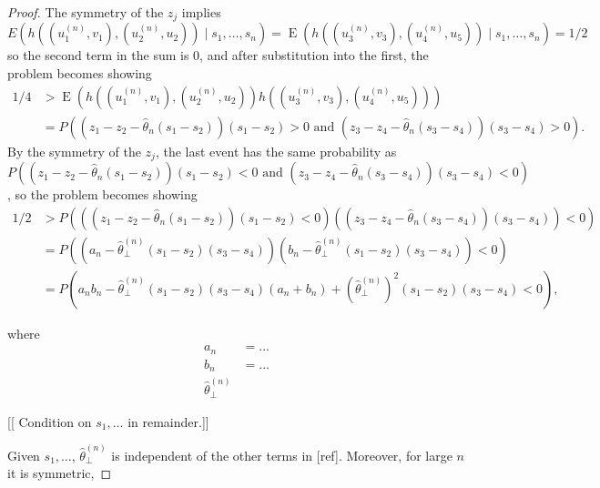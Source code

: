 \documentclass[12pt]{article}
\renewcommand{\P}{P}
\DeclareMathOperator{\E}{E}
\begin{document}
{\begin{proof}
      The symmetry of the $z_j$ implies $E\left(h((u_1^{(n)},v_1),(u_2^{(n)},u_2))\mid s_1,\ldots,s_n\right)=\E\left(h((u_3^{(n)},v_3),(u_4^{(n)},u_5))\mid s_1,\ldots,s_n\right)=1/2$ so the second term in the sum is 0, and after substitution into the first, the problem becomes showing
      \begin{align}
        1/4 &>  \E\left(h((u_1^{(n)},v_1),(u_2^{(n)},u_2))h((u_3^{(n)},v_3),(u_4^{(n)},u_5))\right)\\
            &= \P\left((z_1-z_2-\hat{\theta}_n(s_1-s_2))(s_1-s_2)>0 \text{ and } (z_3-z_4-\hat{\theta}_n(s_3-s_4))(s_3-s_4)>0  \right).
      \end{align}
      By the symmetry of the $z_j$, the last event has the same probability as $\P\left((z_1-z_2-\hat{\theta}_n(s_1-s_2))(s_1-s_2)<0 \text{ and } (z_3-z_4-\hat{\theta}_n(s_3-s_4))(s_3-s_4)<0  \right)$, so the problem becomes showing
      \begin{align}
        1/2 &>       \P\left(\left((z_1-z_2-\hat{\theta}_n(s_1-s_2))(s_1-s_2)<0\right)\left((z_3-z_4-\hat{\theta}_n(s_3-s_4))(s_3-s_4)\right)<0  \right)\\
        &=  \P\left(\left(a_n-\hat{\theta}_\perp^{(n)}(s_1-s_2)(s_3-s_4)\right)\left(b_n-\hat{\theta}_\perp^{(n)}(s_1-s_2)(s_3-s_4)\right)<0\right)\\
        &=  \P\left(a_nb_n-\hat{\theta}_\perp^{(n)}(s_1-s_2)(s_3-s_4)(a_n+b_n)+(\hat{\theta}_{\perp}^{(n)})^2(s_1-s_2)(s_3-s_4) <0\right),
      \end{align}

      where
      \begin{align}
        a_n&=...\\
        b_n&=...\\
        \hat{\theta}_\perp^{(n)}
      \end{align}

      [[      Condition on $s_1,\ldots$ in remainder.]]

      Given $s_1,\ldots$, $\hat{\theta}_\perp^{(n)}$ is independent of the other terms in [ref]. Moreover, for large $n$ it is symmetric, 
    \end{proof}
}
\end{document}
